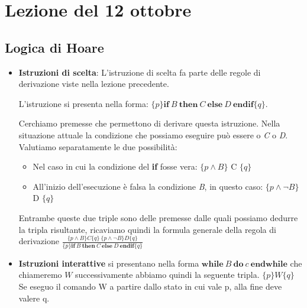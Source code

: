 \section{Lezione del 12 ottobre}
\subsection{Logica di Hoare}

\begin{itemize}
    \item \textbf{Istruzioni di scelta}: L'istruzione di     scelta fa parte delle regole di derivazione viste     nella lezione precedente. 

    L'istruzione si presenta nella forma: $\{p\} \textbf{if} \ B \ \textbf{then} \ C \ \textbf{else} \ D \ \textbf{endif} \{q\}$.
    
    
    Cerchiamo premesse che permettono di derivare questa istruzione. Nella situazione attuale la condizione che possiamo eseguire può essere o \textit{C} o \textit{D}. Valutiamo separatamente le due possibilità:
    \begin{itemize}
        \item Nel caso in cui la condizione del \textbf{if} fosse vera: $\{p \land B\}$ C $\{q\}$ 
            \item All'inizio dell'esecuzione è falsa la condizione \textit{B}, in questo caso: $\{p \land \neg B\}$ D $\{q\}$ 
        \end{itemize}
        Entrambe queste due triple sono delle premesse dalle quali possiamo dedurre la tripla risultante, ricaviamo quindi la formula generale della regola di derivazione
            $\displaystyle \frac{
                    \{p \land B \} C \{q\} \ \{p \land \neg B\} D \{q\}
                }
                {
                    \{p\} \textbf{if} \ B \ \textbf{then} \ C \ \textbf{else} \ D \ \textbf{endif} \{q\}
                }$
                
    \item \textbf{Istruzioni interattive} si presentano nella forma $\textbf{while} \ B \ \textbf{do} \ c \ \textbf{endwhile}$ che chiameremo $W$ successivamente
    abbiamo quindi la seguente tripla.
    $\{p \} W \{q\}$  Se eseguo il comando W a partire dallo stato in cui vale p, alla fine deve valere q.
    

\end{itemize}
